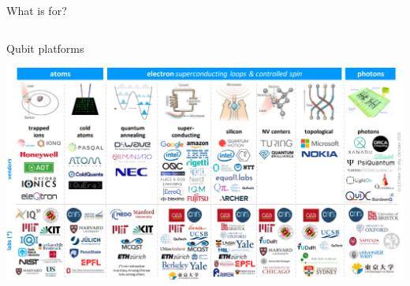 \documentclass[aspectratio=169,10pt]{beamer}
\begin{document}
\begin{frame}{What is for?}
\begin{columns}
\begin{column}{0.5\textwidth}
\begin{center}
        \end{center}
      \end{column}
  \end{columns}
\end{frame}

\begin{frame}{Qubit platforms}
  \begin{center}
      \includegraphics[height=0.82\textheight]{figures/platforms.png}
  \end{center}
\end{frame}
\end{document}
